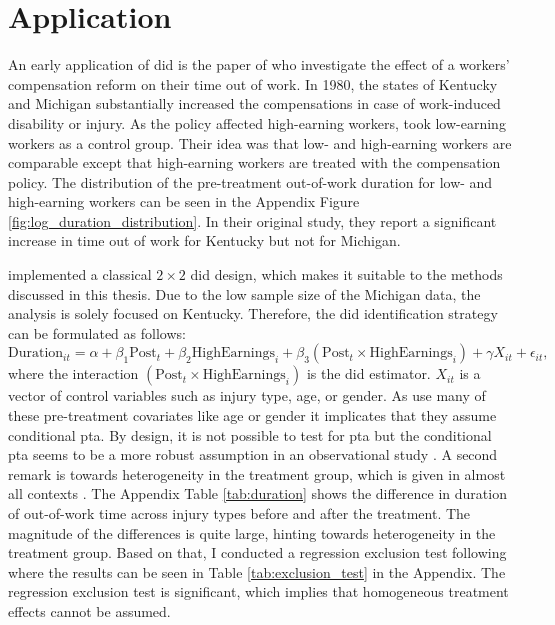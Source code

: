 \section{Application}

An early application of \ac{did} is the paper of \citet{meyer1990workers} who investigate the effect of a workers' compensation reform on their time out of work.
In 1980, the states of Kentucky and Michigan substantially increased the compensations in case of work-induced disability or injury.
As the policy affected high-earning workers, \citet{meyer1990workers} took low-earning workers as a control group.
Their idea was that low- and high-earning workers are comparable except that high-earning workers are treated with the compensation policy.
The distribution of the pre-treatment out-of-work duration for low- and high-earning workers can be seen in the Appendix Figure \ref{fig:log_duration_distribution}.
In their original study, they report a significant increase in time out of work for Kentucky but not for Michigan.

\citet{meyer1990workers} implemented a classical $2 \times 2$ \ac{did} design, which makes it suitable to the methods discussed in this thesis.
Due to the low sample size of the Michigan data, the analysis is solely focused on Kentucky.
Therefore, the \ac{did} identification strategy can be formulated as follows:
\begin{equation}
\text{Duration}_{it} = \alpha + \beta_1 \text{Post}_t + \beta_2 \text{HighEarnings}_i + \beta_3 (\text{Post}_t \times \text{HighEarnings}_i) + \gamma X_{it} + \epsilon_{it},
\label{eq:duration}
\end{equation}
where the interaction $(\text{Post}_t \times \text{HighEarnings}_i)$ is the \ac{did} estimator.
$X_{it}$ is a vector of control variables such as injury type, age, or gender.
As \citet{meyer1990workers} use many of these pre-treatment covariates like age or gender it implicates that they assume conditional \ac{pta}.
By design, it is not possible to test for \ac{pta} but the conditional \ac{pta} seems to be a more robust assumption in an observational study \citep{santannaDoublyRobustDifferenceindifferences2020}.
A second remark is towards heterogeneity in the treatment group, which is given in almost all contexts \citep{DeepLearningIndividual2021}.
The Appendix Table \ref{tab:duration} shows the difference in duration of out-of-work time across injury types before and after the treatment.
The magnitude of the differences is quite large, hinting towards heterogeneity in the treatment group.
Based on that, I conducted a regression exclusion test following \citet{hansen2022econometrics} where the results can be seen in Table \ref{tab:exclusion_test} in the Appendix.
The regression exclusion test is significant, which implies that homogeneous treatment effects cannot be assumed.

